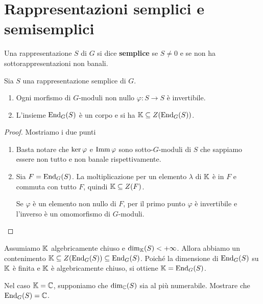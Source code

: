 \section{Rappresentazioni semplici e semisemplici}


\begin{definition}
    Una rappresentazione $S$ di $G$ si dice \textbf{semplice} se $S\ne 0$ e se non ha sottorappresentazioni non banali.
\end{definition}

\begin{lemma}\label{LmSchur} Sia $S$ una rappresentazione semplice di $G$. \begin{enumerate}
    \item Ogni morfismo di $G$-moduli  non nullo $\varphi\colon S \to S$ è invertibile.
    \item L'insieme $\operatorname{End}_G(S)$ è un corpo e si ha $\mathbb{K}\subseteq Z(\operatorname{End}_G(S))$.
\end{enumerate}
\end{lemma}
\begin{proof}
Mostriamo i due punti
\setlength{\leftmargini}{0cm}
\begin{enumerate}
\item Basta notare che $\ker\varphi$ e $\operatorname{Imm} \varphi$ sono sotto-$G$-moduli di $S$ che sappiamo essere non tutto e non banale rispettivamente.
\item Sia $F=\operatorname{End}_G(S)$. La moltiplicazione per un elemento $\lambda$ di $\mathbb{K}$ è in $F$ e commuta con tutto $F$, quindi $\mathbb{K}\subseteq Z(F)$. 

Se $\varphi$ è un elemento non nullo di $F$, per il primo punto $\varphi$ è invertibile e l'inverso è un omomorfismo di $G$-moduli.
\end{enumerate}
\setlength{\leftmargini}{0.5cm}
\end{proof}

\begin{example}
Assumiamo $\mathbb{K}$ algebricamente chiuso e $\dim_{\mathbb{K}}(S)<+\infty$. Allora abbiamo un contenimento $\mathbb{K}\subseteq Z(\operatorname{End}_G(S))\subseteq \operatorname{End}_G(S)$. Poiché la dimensione di $\operatorname{End}_G(S)$ su $\mathbb{K}$ è finita e $\mathbb{K}$ è algebricamente chiuso, si ottiene $\mathbb{K}=\operatorname{End}_G(S)$.
\end{example}

\begin{exercise}
    Nel caso $\mathbb{K}=\mathbb{C}$, supponiamo che $\dim_{\mathbb{C}}(S)$ sia al più numerabile. Mostrare che $\operatorname{End}_G(S)=\mathbb{C}$.
\end{exercise}

